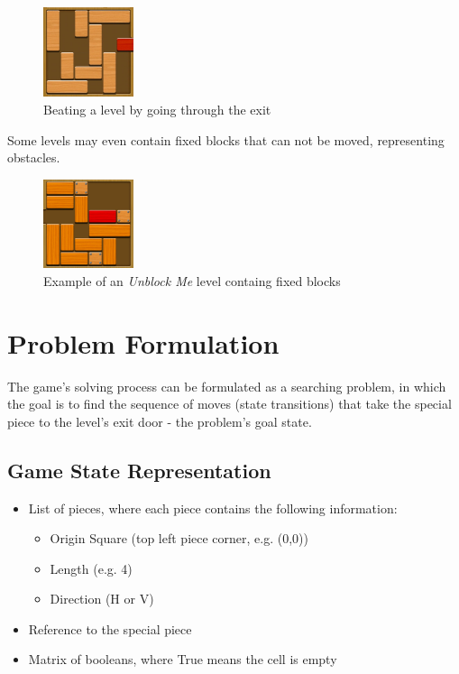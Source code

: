\documentclass[conference]{IEEEtran}
\begin{document}
\begin{figure}[H]
    \centerline{\includegraphics[width=100px]{img3.png}}
    \caption{Beating a level by going through the exit}
    \label{fig}
\end{figure}

Some levels may even contain fixed blocks that can not be moved, representing obstacles.
 
\begin{figure}[H]
    \centerline{\includegraphics[width=100px]{img4.png}}
    \caption{Example of an \textit{Unblock Me} level containg fixed blocks}
    \label{fig}
\end{figure}

\section{Problem Formulation}
The game's solving process can be formulated as a searching problem, in which the goal is to find the sequence of moves (state transitions) that take the special piece to the level's exit door - the problem's goal state. 

\subsection{Game State Representation} \label{subsec:gr}

\begin{itemize}
    \item List of pieces, where each piece contains the following information:
    \begin{itemize}
        \item Origin Square (top left piece corner, e.g. (0,0))
        \item Length (e.g. 4)
        \item Direction (H or V)
    \end{itemize}
    \item Reference to the special piece
    \item Matrix of booleans, where True means the cell is empty
\end{itemize}
\end{document}
